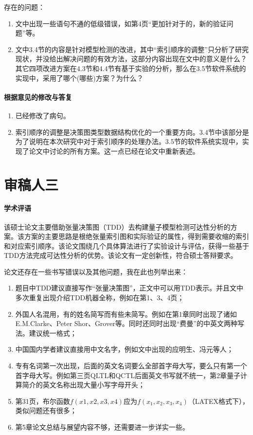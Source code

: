 \documentclass{article} %
\begin{document}
存在的问题：
\begin{enumerate}
    \item 文中出现一些语句不通的低级错误，如第4页“更加针对于的，新的验证问题”等。
    \item 文中3.4节的内容是针对模型检测的改进，其中“索引顺序的调整”只分析了研究现状，并没给出解决问题的有效方法，这部分内容出现在文中的意义是什么？其它四项改进方案在4.3节和4.4节有基于实验的分析，那么在3.5节软件系统的实现中，采用了哪个(哪些)方案？为什么？
\end{enumerate}

\paragraph{根据意见的修改与答复}
\begin{enumerate}
    \item 已经修改了病句。
    \item 索引顺序的调整是决策图类型数据结构优化的一个重要方向。3.4节中该部分是为了说明在本次研究中对于索引顺序的处理办法。3.5节的软件系统实现中，实现了论文中讨论的所有方案。这一点已经在论文中重新表述。
\end{enumerate}
\section*{审稿人三}
\paragraph{学术评语}该硕士论文主要借助张量决策图（TDD）去构建量子模型检测可达性分析的方案。该方案的主要思路是根绝张量索引图和实际验证的属性，得到需要收缩的索引和对应索引顺序。该论文围绕几个具体算法进行了实验设计与评估，获得一些基于TDD方法完成可达性分析的优势。该论文有一定创新性，符合硕士答辩要求。

论文还存在一些书写错误以及其他问题，我在此也列举出来：
\begin{enumerate}
    \item 题目中TDD建议直接写作“张量决策图”，正文中可以用TDD表示。并且文中多次重复出现介绍TDD机器全称，例如在第1、3、4页；
    \item 外国人名混用，有的姓名简写而有些未简写。例如在第1章同时出现了诸如E.M.Clarke、Peter Shor、Grover等。同时还同时出现“费曼”的中英文两种写法。建议统一格式；
    \item 中国国内学者建议直接用中文名字，例如文中出现的应明生、冯元等人；
    \item 专有名词第一次出现，后面的英文名词要么全部首字母大写，要么只有第一个首字母大写。例如第三页QLTL和QCTL后面英文书写就不统一，第2章量子计算简介的英文名称出现大量小写字母开头；
    \item 第31页，布尔函数$f(x1,x2,x3,x4)$应为$f(x_1,x_2,x_3,x_4) $（LATEX格式下），类似问题还有很多；
    \item 第5章论文总结与展望内容不够，还需要进一步详实一些。
\end{enumerate}
\end{document}
